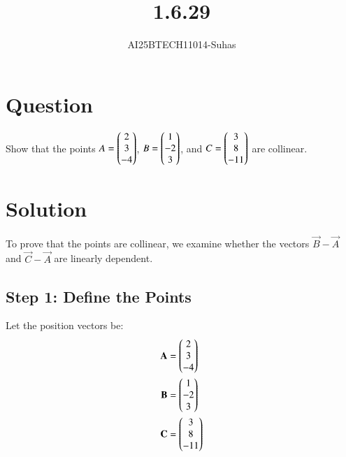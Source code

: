 \documentclass[journal]{IEEEtran}
\begin{document}


\title{1.6.29}
\author{AI25BTECH11014-Suhas}

{\let\newpage\relax\maketitle}

\renewcommand{\thefigure}{\theenumi}
\renewcommand{\thetable}{\theenumi}
\setlength{\intextsep}{10pt}

\renewcommand{\thetable}{\theenumi}

\section*{Question}
\vspace{0.5cm}
Show that the points $A = \begin{pmatrix}2\\3\\-4\end{pmatrix}$, $B = \begin{pmatrix}1\\-2\\3\end{pmatrix}$, and $C = \begin{pmatrix}3\\8\\-11\end{pmatrix}$ are collinear.

\section*{Solution}
\vspace{0.5cm}
To prove that the points are collinear, we examine whether the vectors $\vec{B} - \vec{A}$ and $\vec{C} - \vec{A}$ are linearly dependent.

\subsection*{Step 1: Define the Points}
Let the position vectors be:
\begin{align}
\mathbf{A} &= \begin{pmatrix}2\\3\\-4\end{pmatrix} \\
\mathbf{B} &= \begin{pmatrix}1\\-2\\3\end{pmatrix} \\
\mathbf{C} &= \begin{pmatrix}3\\8\\-11\end{pmatrix}
\end{align}
\end{document}
